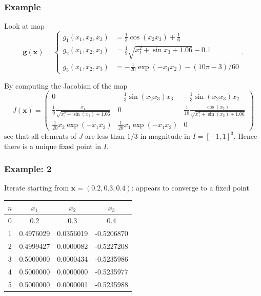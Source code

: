 \documentclass{beamer}
\newcommand{\bfm}[1]{{\boldsymbol{#1}}}
\begin{document}
\begin{frame}
  \frametitle{Example}

  Look at map
  \begin{equation*}
    \bfm{g}(\bfm{x}) = \left\{
      \begin{aligned}
        g_1 (x_1, x_2, x_3) & = \tfrac{1}{3} \cos( x_2 x_3 ) +
        \tfrac{1}{6} \\
        g_2 (x_1, x_2, x_3) & = \tfrac{1}{9} \sqrt{x_1^2 + \sin{x_3} +
        1.06} - 0.1 \\
        g_3 (x_1, x_2, x_3) & = -\tfrac{1}{20} \exp(-x_1 x_2) - (10
        \pi - 3) / 60
      \end{aligned}
    \right. .
  \end{equation*} \pause

  By computing the Jacobian of the map
  \begin{equation*}
    J(\bfm{x}) =
    \begin{pmatrix}
      0 & -\tfrac{1}{3} \sin(x_2 x_3) x_3 &  -\tfrac{1}{3} \sin(x_2
      x_3) x_2 \\
      \tfrac{1}{9} \frac{x_1}{\sqrt{x_1^2 + \sin(x_3) + 1.06}} & 0 &
      \tfrac{1}{18} \frac{\cos(x_3)}{\sqrt{x_1^2 + \sin(x_3) + 1.06}}
      \\
      \tfrac{1}{20} x_2 \exp(-x_1 x_2) & \tfrac{1}{20} x_1 \exp(-x_1
      x_2) & 0
    \end{pmatrix}
  \end{equation*}
  see that all elements of $J$ are less than $1/3$ in magnitude in
  $I = [-1,1]^3$. Hence there is a unique fixed point in $I$.

\end{frame}

\begin{frame}
  \frametitle{Example: 2}

  Iterate starting from $\bfm{x} = (0.2, 0.3, 0.4)$: appears to converge to a fixed point
  \begin{center}
    \begin{tabular}{c|c c c}
      $n$ & $x_1$ & $x_2$ & $x_3$ \\ \hline
      0 & 0.2 & 0.3 & 0.4 \\
      1 & 0.4976029  &  0.0356019 &  -0.5206870 \\
      2 & 0.4999427  &  0.0000082 &  -0.5227208 \\
      3 & 0.5000000  &  0.0000434 &  -0.5235986 \\
      4 & 0.5000000  &  0.0000000 &  -0.5235977 \\
      5 & 0.5000000  &  0.0000001 &  -0.5235988
    \end{tabular}
  \end{center}

\end{frame}
\end{document}
